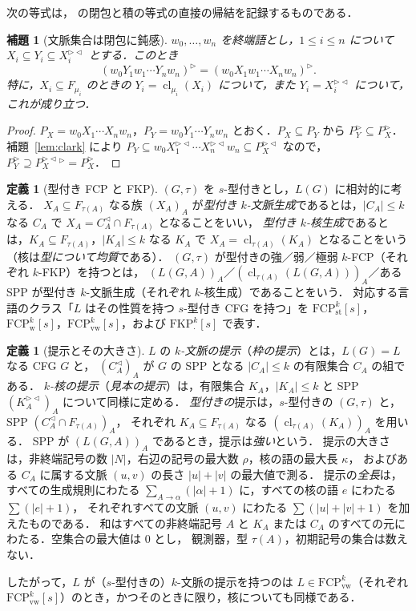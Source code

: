 \documentclass[11pt,a4paper]{ltjsarticle}
\numberwithin{equation}{section}
\theoremstyle{plain}
\newtheorem{lemma}[theorem]{補題}
\theoremstyle{definition}
\newtheorem{definition}[theorem]{定義}
\theoremstyle{remark}
\theoremstyle{plain}
\newcommand{\R}{^{\rhd}}
\newcommand{\Lc}{^{\lhd}}
\newcommand{\RL}{^{\rhd\lhd}}
\newcommand{\cl}{\operatorname{cl}}
\newcommand{\FCP}[2]{\mathrm{FCP}^{#1}_{\mathrm{#2}}}
\newcommand{\tFCP}[3]{\mathrm{FCP}^{#1}_{\mathrm{#2}}[#3]}
\newcommand{\tFKP}[3]{\mathrm{FKP}^{#1}_{\mathrm{#2}}[#3]}
\begin{document}
次の等式は，\citet[Sec.~3, Eq.~(1)]{ky2017} の閉包と積の等式の直接の帰結を記録するものである．

\begin{lemma}[文脈集合は閉包に鈍感]\label{lem:star}
$w_0,\dots,w_n$ を終端語とし，$1\le i\le n$ について $X_i\subseteq Y_i\subseteq X_i\RL$ とする．このとき
\[
(w_0Y_1w_1\cdots Y_nw_n)\R=(w_0X_1w_1\cdots X_nw_n)\R .
\]
特に，$X_i\subseteq F_{\mu_i}$ のときの $Y_i=\cl_{\mu_i}(X_i)$ について，また $Y_i=X_i\RL$ について，これが成り立つ．
\end{lemma}
\begin{proof}
$P_X=w_0X_1\cdots X_nw_n$，$P_Y=w_0Y_1\cdots Y_nw_n$ とおく．$P_X\subseteq P_Y$ から $P_Y\R\subseteq P_X\R$．
補題~\ref{lem:clark} により $P_Y\subseteq w_0X_1\RL\cdots X_n\RL w_n\subseteq P_X\RL$ なので，
$P_Y\R\supseteq P_X\RL{}\R=P_X\R$．
\end{proof}

\begin{definition}[型付き FCP と FKP]\label{def:typed-props}
$(G,\tau)$ を $s$-型付きとし，$L(G)$ に相対的に考える．
$X_A\subseteq F_{\tau(A)}$ なる族 $(X_A)_A$ が\emph{型付き $k$-文脈生成}であるとは，$|C_A|\le k$ なる $C_A$ で $X_A=C_A\Lc\cap F_{\tau(A)}$ となることをいい，
\emph{型付き $k$-核生成}であるとは，$K_A\subseteq F_{\tau(A)}$，$|K_A|\le k$ なる $K_A$ で $X_A=\cl_{\tau(A)}(K_A)$ となることをいう
（核は\emph{型について均質}である）．
$(G,\tau)$ が型付きの強／弱／極弱 $k$-FCP（それぞれ $k$-FKP）を持つとは，
$(L(G,A))_A$／$(\cl_{\tau(A)}(L(G,A)))_A$／ある SPP が型付き $k$-文脈生成（それぞれ $k$-核生成）であることをいう．
対応する言語のクラス「$L$ はその性質を持つ $s$-型付き CFG を持つ」を
$\tFCP{k}{st}{s}$，$\tFCP{k}{w}{s}$，$\tFCP{k}{vw}{s}$，および $\tFKP{k}{\cdot}{s}$ で表す．
\end{definition}

\begin{definition}[提示とその大きさ]\label{def:presentation}
$L$ の \emph{$k$-文脈の提示}（\emph{枠の提示}）とは，$L(G)=L$ なる CFG $G$ と，
$(C_A\Lc)_A$ が $G$ の SPP となる $|C_A|\le k$ の有限集合 $C_A$ の組である．
\emph{$k$-核の提示}（\emph{見本の提示}）は，有限集合 $K_A$，$|K_A|\le k$ と SPP $(K_A\RL)_A$ について同様に定める．
\emph{型付きの}提示は，$s$-型付きの $(G,\tau)$ と，SPP $(C_A\Lc\cap F_{\tau(A)})_A$，
それぞれ $K_A\subseteq F_{\tau(A)}$ なる $(\cl_{\tau(A)}(K_A))_A$ を用いる．
SPP が $(L(G,A))_A$ であるとき，提示は\emph{強い}という．
提示の大きさは，非終端記号の数 $|N|$，右辺の記号の最大数 $\rho$，核の語の最大長 $\kappa$，
およびある $C_A$ に属する文脈 $(u,v)$ の長さ $|u|+|v|$ の最大値で測る．
提示の\emph{全長}は，すべての生成規則にわたる $\sum_{A\to\alpha}(|\alpha|+1)$ に，すべての核の語 $e$ にわたる $\sum(|e|+1)$，
それぞれすべての文脈 $(u,v)$ にわたる $\sum(|u|+|v|+1)$ を加えたものである．
和はすべての非終端記号 $A$ と $K_A$ または $C_A$ のすべての元にわたる．空集合の最大値は $0$ とし，
観測器，型 $\tau(A)$，初期記号の集合は数えない．
\end{definition}
したがって，$L$ が（$s$-型付きの）$k$-文脈の提示を持つのは $L\in\FCP{k}{vw}$（それぞれ $\tFCP{k}{vw}{s}$）のとき，かつそのときに限り，核についても同様である．
\end{document}
